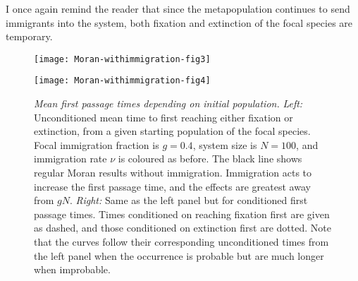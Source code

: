 I once again remind the reader that since the metapopulation continues to send immigrants into the system, both fixation and extinction of the focal species are temporary. 
\begin{figure}[h]
	\centering
	\begin{minipage}{0.45\linewidth}
		\centering
		\texttt{[image: Moran-withimmigration-fig3]}
	\end{minipage}
	\begin{minipage}{0.49\linewidth}
		\centering
		\texttt{[image: Moran-withimmigration-fig4]}
	\end{minipage}
	\caption{\emph{Mean first passage times depending on initial population.}
		\emph{Left:} Unconditioned mean time to first reaching either fixation or extinction, from a given starting population of the focal species. Focal immigration fraction is $g=0.4$, system size is $N=100$, and immigration rate $\nu$ is coloured as before. The black line shows regular Moran results without immigration. Immigration acts to increase the first passage time, and the effects are greatest away from $gN$. 
		\emph{Right:} Same as the left panel but for conditioned first passage times. Times conditioned on reaching fixation first are given as dashed, and those conditioned on extinction first are dotted. Note that the curves follow their corresponding unconditioned times from the left panel when the occurrence is probable but are much longer when improbable. 
	} \label{extntimefig}
\end{figure}

